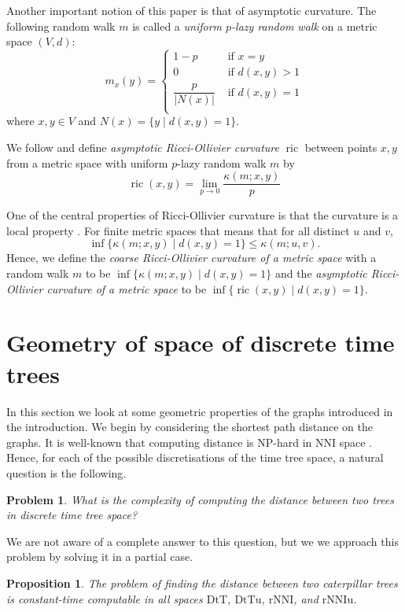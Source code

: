 \documentclass{amsart}
\newtheorem{proposition}[lemma]{Proposition}
\newtheorem{problem}{Problem}
\newcommand{\nni}{\mathrm{NNI}}
\newcommand{\rnni}{\mathrm{rNNI}}
\newcommand{\rnniu}{\mathrm{rNNIu}}
\newcommand{\mdts}{\mathrm{DtT}}
\newcommand{\mdtsu}{\mathrm{DtTu}}
\newcommand{\ric}{\operatorname{ric}}
\begin{document}
Another important notion of this paper is that of asymptotic curvature.
The following random walk $m$ is called a {\em uniform $p$-lazy random walk} on a metric space $(V,d)$:
\[
m_x(y) =
\begin{cases}
1-p				& \mbox{ if } x=y \\
0   				& \mbox{ if } d(x,y) > 1 \\
\dfrac{p}{|N(x)|}		& \mbox{ if } d(x,y) = 1 \\
\end{cases}
\]
where $x,y \in V$ and $N(x) = \{y \mid d(x,y) = 1\}$.

We follow \textcite{Loisel2014-gu} and define {\em asymptotic Ricci-Ollivier curvature} $\ric$ between points $x,y$ from a metric space with uniform $p$-lazy random walk $m$ by
\[
\ric(x,y) = \lim_{p\to0} \frac{\kappa(m;x,y)}{p}
\]

One of the central properties of Ricci-Ollivier curvature is that the curvature is a local property \autocite{Ollivier2009-cj}.
For finite metric spaces that means that for all distinct $u$ and $v$,
\[
\inf\{\kappa(m;x,y)\mid d(x,y) = 1\} \leq \kappa(m;u,v).
\]
Hence, we define the {\em coarse Ricci-Ollivier curvature of a metric space} with a random walk $m$ to be $\inf\{\kappa(m;x,y)\mid d(x,y) = 1\}$ and the {\em asymptotic Ricci-Ollivier curvature of a metric space} to be $\inf\{\ric(x,y)\mid d(x,y) = 1\}$.


\section{Geometry of space of discrete time trees}

In this section we look at some geometric properties of the graphs introduced in the introduction.
We begin by considering the shortest path distance on the graphs.
It is well-known that computing distance is NP-hard in $\nni$ space \autocite{Dasgupta2000-xa}.
Hence, for each of the possible discretisations of the time tree space, a natural question is the following.

\begin{problem}
What is the complexity of computing the distance between two trees in discrete time tree space?
\end{problem}

We are not aware of a complete answer to this question, but we we approach this problem by solving it in a partial case.

\begin{proposition}\label{propCaterpillarComplexity}
The problem of finding the distance between two caterpillar trees is constant-time computable in all spaces $\mdts$, $\mdtsu$, $\rnni$, and $\rnniu$.
\end{proposition}
\end{document}
